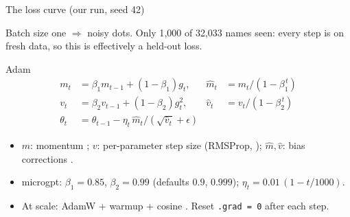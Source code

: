 \documentclass[aspectratio=169,11pt]{beamer}
\begin{document}
\begin{frame}{The loss curve (our run, seed 42)}
\centering
{}

\small Batch size one $\Rightarrow$ noisy dots. Only 1{,}000 of 32{,}033 names seen: every step is on fresh data, so this is effectively a held-out loss.
\end{frame}

\begin{frame}{Adam}
\begin{align*}
m_t &= \beta_1 m_{t-1} + (1-\beta_1)g_t, & \hat m_t &= m_t/(1-\beta_1^{\,t}) \\
v_t &= \beta_2 v_{t-1} + (1-\beta_2)g_t^2, & \hat v_t &= v_t/(1-\beta_2^{\,t}) \\
\theta_t &= \theta_{t-1} - \eta_t\,\hat m_t/(\sqrt{\hat v_t}+\epsilon)
\end{align*}
\begin{itemize}
\small
  \item $m$: momentum \parencite{polyak1964momentum}; $v$: per-parameter step size (RMSProp, \citeauthor{tieleman2012rmsprop} \citeyear{tieleman2012rmsprop}); $\hat m,\hat v$: bias corrections \parencite{kingma2015adam}.
  \item microgpt: $\beta_1{=}0.85$, $\beta_2{=}0.99$ (defaults $0.9$, $0.999$); $\eta_t = 0.01\,(1-t/1000)$.
  \item At scale: AdamW + warmup + cosine \parencite{loshchilov2019adamw,loshchilov2017sgdr}. Reset \texttt{.grad = 0} after each step.
\end{itemize}
\end{frame}

\end{document}
